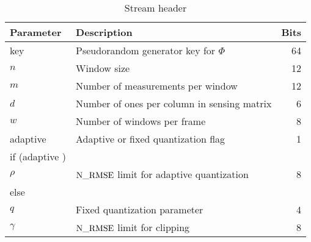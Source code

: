 \begin{table}[ht]
\centering
\caption{Stream header}
\begin{tabular}{llr}
\toprule
Parameter & Description & Bits \\
\midrule 
key & Pseudorandom generator key for $\Phi$ & 64 \\
$n$ & Window size & 12 \\
$m$ & Number of measurements per window & 12 \\
$d$ & Number of ones per column in sensing matrix & 6 \\
$w$ & Number of windows per frame & 8 \\
adaptive & Adaptive or fixed quantization flag & 1 \\
if (adaptive ) &  \\
\hspace{1cm} $\rho$ & $\mathrm{N\_RMSE}$ limit for adaptive quantization & 8 \\
else & \\
\hspace{1cm} $q$ & Fixed quantization parameter & 4 \\
$\gamma$ & $\mathrm{N\_RMSE}$ limit for clipping & 8 \\
\bottomrule
\end{tabular}
\label{tbl:header:stream}
\end{table}
